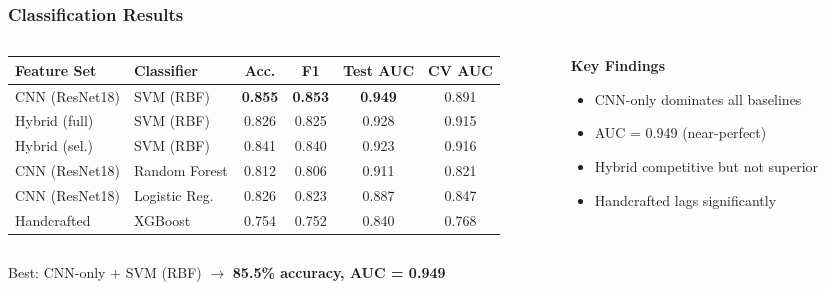 \documentclass[aspectratio=169,professionalfonts]{beamer}
\begin{document}
\begin{frame}
    \frametitle{Classification Results}
    \footnotesize
    
    \begin{columns}[T]
        \begin{column}{0.62\textwidth}
            \begin{table}
                \centering
                \tiny
                \begin{tabular}{@{}p{1.8cm}p{1.5cm}cccc@{}}
                    \toprule
                    \textbf{Feature Set} & \textbf{Classifier} & \textbf{Acc.} & \textbf{F1} & \textbf{Test AUC} & \textbf{CV AUC} \\
                    \midrule
                    CNN (ResNet18) & SVM (RBF) & \textbf{0.855} & \textbf{0.853} & \textbf{0.949} & 0.891 \\
                    Hybrid (full) & SVM (RBF) & 0.826 & 0.825 & 0.928 & 0.915 \\
                    Hybrid (sel.) & SVM (RBF) & 0.841 & 0.840 & 0.923 & 0.916 \\
                    CNN (ResNet18) & Random Forest & 0.812 & 0.806 & 0.911 & 0.821 \\
                    CNN (ResNet18) & Logistic Reg. & 0.826 & 0.823 & 0.887 & 0.847 \\
                    Handcrafted & XGBoost & 0.754 & 0.752 & 0.840 & 0.768 \\
                    \bottomrule
                \end{tabular}
            \end{table}
        \end{column}
        
        \begin{column}{0.35\textwidth}
            \textbf{Key Findings}
            \begin{itemize}
                \footnotesize
                \setlength{\itemsep}{1pt}
                \item CNN-only dominates all baselines
                \item AUC = 0.949 (near-perfect)
                \item Hybrid competitive but not superior
                \item Handcrafted lags significantly
            \end{itemize}
        \end{column}
    \end{columns}
    
    \vspace{0.3em}
    \centerline{\alert{Best:} CNN-only + SVM (RBF) $\rightarrow$ \textbf{85.5\% accuracy, AUC = 0.949}}
\end{frame}
\end{document}
